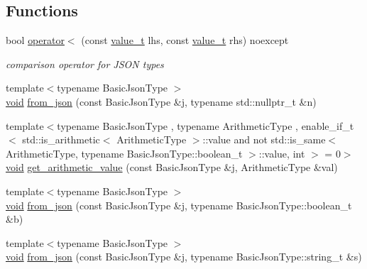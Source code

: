\subsection*{Functions}
\begin{DoxyCompactItemize}
\item 
bool \mbox{\hyperlink{namespacenlohmann_1_1detail_a09169efff3bd1771fff29bd92cea19e0}{operator$<$}} (const \mbox{\hyperlink{namespacenlohmann_1_1detail_a1ed8fc6239da25abcaf681d30ace4985}{value\+\_\+t}} lhs, const \mbox{\hyperlink{namespacenlohmann_1_1detail_a1ed8fc6239da25abcaf681d30ace4985}{value\+\_\+t}} rhs) noexcept
\begin{DoxyCompactList}\small\item\em comparison operator for J\+S\+ON types \end{DoxyCompactList}\item 
{\footnotesize template$<$typename Basic\+Json\+Type $>$ }\\\mbox{\hyperlink{namespacenlohmann_1_1detail_a59fca69799f6b9e366710cb9043aa77d}{void}} \mbox{\hyperlink{namespacenlohmann_1_1detail_a1f0395aad0fe853a4539288749d3a603}{from\+\_\+json}} (const Basic\+Json\+Type \&j, typename std\+::nullptr\+\_\+t \&n)
\item 
{\footnotesize template$<$typename Basic\+Json\+Type , typename Arithmetic\+Type , enable\+\_\+if\+\_\+t$<$ std\+::is\+\_\+arithmetic$<$ Arithmetic\+Type $>$\+::value and not std\+::is\+\_\+same$<$ Arithmetic\+Type, typename Basic\+Json\+Type\+::boolean\+\_\+t $>$\+::value, int $>$  = 0$>$ }\\\mbox{\hyperlink{namespacenlohmann_1_1detail_a59fca69799f6b9e366710cb9043aa77d}{void}} \mbox{\hyperlink{namespacenlohmann_1_1detail_a85955b9c6dd31846e4b8e891f78614b6}{get\+\_\+arithmetic\+\_\+value}} (const Basic\+Json\+Type \&j, Arithmetic\+Type \&val)
\item 
{\footnotesize template$<$typename Basic\+Json\+Type $>$ }\\\mbox{\hyperlink{namespacenlohmann_1_1detail_a59fca69799f6b9e366710cb9043aa77d}{void}} \mbox{\hyperlink{namespacenlohmann_1_1detail_a58117f225f43d03e3a0a4a6f3d77c9d9}{from\+\_\+json}} (const Basic\+Json\+Type \&j, typename Basic\+Json\+Type\+::boolean\+\_\+t \&b)
\item 
{\footnotesize template$<$typename Basic\+Json\+Type $>$ }\\\mbox{\hyperlink{namespacenlohmann_1_1detail_a59fca69799f6b9e366710cb9043aa77d}{void}} \mbox{\hyperlink{namespacenlohmann_1_1detail_ad74d89f77ada7a57eff38b43d4bf2335}{from\+\_\+json}} (const Basic\+Json\+Type \&j, typename Basic\+Json\+Type\+::string\+\_\+t \&s)

\end{DoxyCompactItemize}
